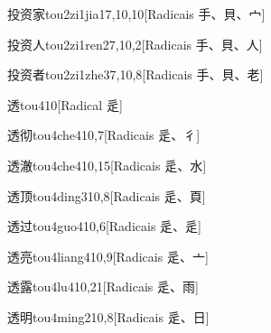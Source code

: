 \begin{entry}{投资家}{tou2zi1jia1}{7,10,10}[Radicais ⼿、⾙、⼧]
\end{entry}

\begin{entry}{投资人}{tou2zi1ren2}{7,10,2}[Radicais ⼿、⾙、⼈]
\end{entry}

\begin{entry}{投资者}{tou2zi1zhe3}{7,10,8}[Radicais ⼿、⾙、⽼]
\end{entry}

\begin{entry}{透}{tou4}{10}[Radical ⾡]
\end{entry}

\begin{entry}{透彻}{tou4che4}{10,7}[Radicais ⾡、⼻]
\end{entry}

\begin{entry}{透澈}{tou4che4}{10,15}[Radicais ⾡、⽔]
\end{entry}

\begin{entry}{透顶}{tou4ding3}{10,8}[Radicais ⾡、⾴]
\end{entry}

\begin{entry}{透过}{tou4guo4}{10,6}[Radicais ⾡、⾡]
\end{entry}

\begin{entry}{透亮}{tou4liang4}{10,9}[Radicais ⾡、⼇]
\end{entry}

\begin{entry}{透露}{tou4lu4}{10,21}[Radicais ⾡、⾬]
\end{entry}

\begin{entry}{透明}{tou4ming2}{10,8}[Radicais ⾡、⽇]
\end{entry}

